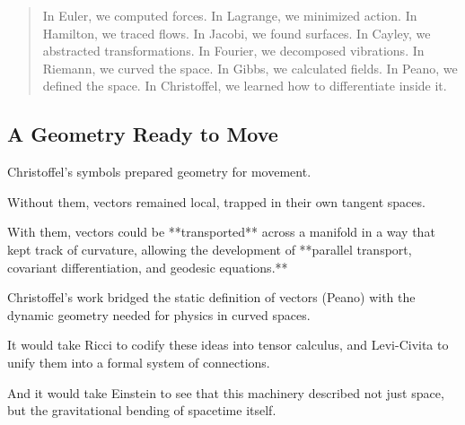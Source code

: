 \bigskip

\begin{quote}
In Euler, we computed forces.  
In Lagrange, we minimized action.  
In Hamilton, we traced flows.  
In Jacobi, we found surfaces.  
In Cayley, we abstracted transformations.  
In Fourier, we decomposed vibrations.  
In Riemann, we curved the space.  
In Gibbs, we calculated fields.  
In Peano, we defined the space.  
In Christoffel, we learned how to differentiate inside it.
\end{quote}

\subsection*{A Geometry Ready to Move}

Christoffel’s symbols prepared geometry for movement.

Without them, vectors remained local, trapped in their own tangent spaces.

With them, vectors could be **transported** across a manifold in a way that kept track of curvature,  
allowing the development of **parallel transport, covariant differentiation, and geodesic equations.**

Christoffel’s work bridged the static definition of vectors (Peano)  
with the dynamic geometry needed for physics in curved spaces.

It would take Ricci to codify these ideas into tensor calculus,  
and Levi-Civita to unify them into a formal system of connections.

And it would take Einstein to see that this machinery described not just space,  
but the gravitational bending of spacetime itself.

